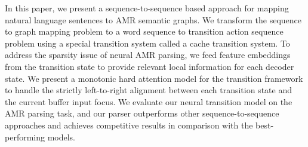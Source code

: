 In this paper, we present a sequence-to-sequence based approach for mapping natural language sentences to AMR semantic graphs. We transform the sequence to graph mapping problem to a word sequence to transition action sequence problem using a special transition system called a cache transition system. To address the sparsity issue of neural AMR parsing, we feed feature embeddings from the transition state to provide relevant local information for each decoder state. We present a monotonic hard attention model for the transition framework to handle the strictly left-to-right alignment between each transition state and the current buffer input focus. We evaluate our neural transition model on the AMR parsing task, and our parser outperforms other sequence-to-sequence approaches and achieves competitive results in comparison with the best-performing models.
